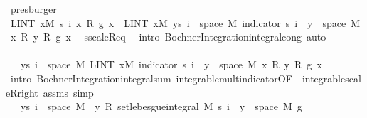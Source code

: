 \begin{isabellebody}
\ presburger\isanewline
\ \ \ \ \ \ \ \ \isanewline
\ \ \ \ \ \ \ \ \isamarkupfalse%
\ {\isachardoublequoteopen}LINT\ x{\isacharbar}{\kern0pt}M{\isachardot}{\kern0pt}\ s\ i\ x\ {\isacharasterisk}{\kern0pt}\isactrlsub R\ g\ x\ {\isacharequal}{\kern0pt}\ LINT\ x{\isacharbar}{\kern0pt}M{\isachardot}{\kern0pt}\ {\isacharparenleft}{\kern0pt}{\isasymSum}y{\isasymin}s\ i\ {\isacharbackquote}{\kern0pt}\ space\ M{\isachardot}{\kern0pt}\ indicator\ {\isacharparenleft}{\kern0pt}s\ i\ {\isacharminus}{\kern0pt}{\isacharbackquote}{\kern0pt}\ {\isacharbraceleft}{\kern0pt}y{\isacharbraceright}{\kern0pt}\ {\isasyminter}\ space\ M{\isacharparenright}{\kern0pt}\ x\ {\isacharasterisk}{\kern0pt}\isactrlsub R\ y\ {\isacharasterisk}{\kern0pt}\isactrlsub R\ g\ x{\isacharparenright}{\kern0pt}{\isachardoublequoteclose}\ \isamarkupfalse%
\ s{\isacharunderscore}{\kern0pt}scaleR{\isacharunderscore}{\kern0pt}eq\ \isamarkupfalse%
\ {\isacharparenleft}{\kern0pt}intro\ Bochner{\isacharunderscore}{\kern0pt}Integration{\isachardot}{\kern0pt}integral{\isacharunderscore}{\kern0pt}cong{\isacharparenright}{\kern0pt}\ auto\isanewline
\ \ \ \ \ \ \ \ \isamarkupfalse%
\ \isamarkupfalse%
\ {\isachardoublequoteopen}{\isachardot}{\kern0pt}{\isachardot}{\kern0pt}{\isachardot}{\kern0pt}\ {\isacharequal}{\kern0pt}\ {\isacharparenleft}{\kern0pt}{\isasymSum}y{\isasymin}s\ i\ {\isacharbackquote}{\kern0pt}\ space\ M{\isachardot}{\kern0pt}\ LINT\ x{\isacharbar}{\kern0pt}M{\isachardot}{\kern0pt}\ indicator\ {\isacharparenleft}{\kern0pt}s\ i\ {\isacharminus}{\kern0pt}{\isacharbackquote}{\kern0pt}\ {\isacharbraceleft}{\kern0pt}y{\isacharbraceright}{\kern0pt}\ {\isasyminter}\ space\ M{\isacharparenright}{\kern0pt}\ x\ {\isacharasterisk}{\kern0pt}\isactrlsub R\ y\ {\isacharasterisk}{\kern0pt}\isactrlsub R\ g\ x{\isacharparenright}{\kern0pt}{\isachardoublequoteclose}\ \isamarkupfalse%
\ {\isacharparenleft}{\kern0pt}intro\ Bochner{\isacharunderscore}{\kern0pt}Integration{\isachardot}{\kern0pt}integral{\isacharunderscore}{\kern0pt}sum\ integrable{\isacharunderscore}{\kern0pt}mult{\isacharunderscore}{\kern0pt}indicator{\isacharbrackleft}{\kern0pt}OF\ {\isacharunderscore}{\kern0pt}\ integrable{\isacharunderscore}{\kern0pt}scaleR{\isacharunderscore}{\kern0pt}right{\isacharbrackright}{\kern0pt}\ assms{\isacharparenleft}{\kern0pt}{}{\isacharparenright}{\kern0pt}{\isacharparenright}{\kern0pt}\ simp\isanewline
\ \ \ \ \ \ \ \ \isamarkupfalse%
\ \isamarkupfalse%
\ {\isachardoublequoteopen}{\isachardot}{\kern0pt}{\isachardot}{\kern0pt}{\isachardot}{\kern0pt}\ {\isacharequal}{\kern0pt}\ {\isacharparenleft}{\kern0pt}{\isasymSum}y{\isasymin}s\ i\ {\isacharbackquote}{\kern0pt}\ space\ M{\isachardot}{\kern0pt}\ \ y\ {\isacharasterisk}{\kern0pt}\isactrlsub R\ set{\isacharunderscore}{\kern0pt}lebesgue{\isacharunderscore}{\kern0pt}integral\ M\ {\isacharparenleft}{\kern0pt}s\ i\ {\isacharminus}{\kern0pt}{\isacharbackquote}{\kern0pt}\ {\isacharbraceleft}{\kern0pt}y{\isacharbraceright}{\kern0pt}\ {\isasyminter}\ space\ M{\isacharparenright}{\kern0pt}\ g{\isacharparenright}{\kern0pt}{\isachardoublequoteclose}\ \isamarkupfalse%

\end{isabellebody}
